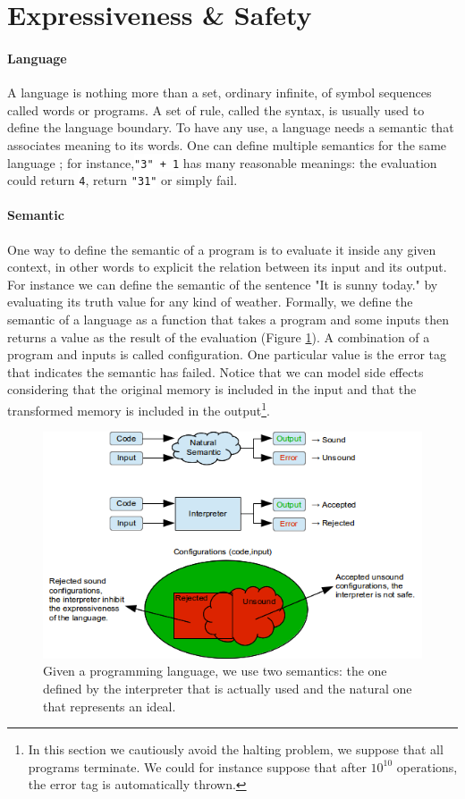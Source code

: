 \documentclass[a4paper]{report}
\newcommand{\ijava}[1]{\colorbox{white}{\lstinline[language=code]&#1&}} %
\newcommand{\reffig}[1]{(Figure \ref{#1})}
\begin{document}
\section{Expressiveness \& Safety}

\paragraph{Language} A language is nothing more than a set, ordinary infinite, of symbol sequences called words or programs. A set of rule, called the syntax, is usually used to define the language boundary. To have any use, a language needs a semantic that associates meaning to its words. One can define multiple semantics for the same language ; for instance,\ijava{"3" + 1} has many reasonable meanings: the evaluation could return \ijava{4}, return \ijava{"31"} or simply fail.

\paragraph{Semantic} One way to define the semantic of a program is to evaluate it inside any given context, in other words to explicit the relation between its input and its output. For instance we can define the semantic of the sentence "It is sunny today." by evaluating its truth value for any kind of weather. Formally, we define the semantic of a language as a function that takes a program and some inputs then returns a value as the result of the evaluation \reffig{sem_inter}. A combination of a program and inputs is called configuration. One particular value is the error tag that indicates the semantic has failed. Notice that we can model side effects considering that the original memory is included in the input and that the transformed memory is included in the output\footnote{In this section we cautiously avoid the halting problem, we suppose that all programs terminate. We could for instance suppose that after $10^{10}$ operations, the error tag is automatically thrown.}.

\begin{figure}
\centering
\includegraphics{images/sem_inter.png}
\caption{Given a programming language, we use two semantics: the one defined by the interpreter that is actually used and the natural one that represents an ideal.}
\label{sem_inter}
\end{figure}
\end{document}
